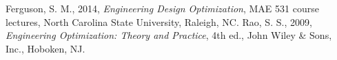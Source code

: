 \documentclass{article}
\begin{document}
\begin{thebibliography}{99}
 Ferguson, S. M., 2014, \emph{Engineering Design Optimization}, MAE 531 course
  lectures, North Carolina State University, Raleigh, NC.
 Rao, S. S., 2009, \emph{Engineering Optimization: Theory and Practice}, 4th ed.,
  John Wiley \& Sons, Inc., Hoboken, NJ.
\end{thebibliography}
\end{document}
